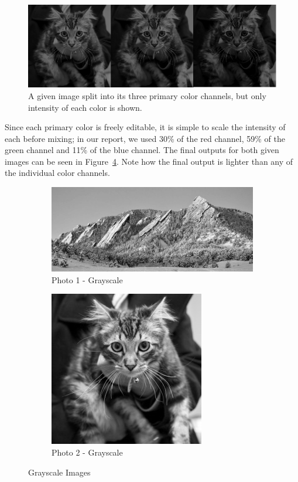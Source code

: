     \begin{figure}[ht]
      \centering
      \includegraphics[scale=0.4]{./img/photo2-explodedg.png}
      \caption{A given image split into its three primary color channels, but only intensity of each color is shown.}
      \label{3gray}
    \end{figure}

Since each primary color is freely editable, it is simple to scale the intensity of each before mixing; in our report, we used 30\% of the red channel, 59\% of the green channel and 11\% of the blue channel. The final outputs for both given images can be seen in Figure~\ref{fig:gray_images}. Note how the final output is lighter than any of the individual color channels.

    \begin{figure}[ht]
      \centering
      \begin{subfigure}{0.6\textwidth}
        \centering
        \includegraphics[scale=0.5]{./img/gray1.png}
        \caption{Photo 1 - Grayscale}
        \label{fig:p1g}
      \end{subfigure}
      \begin{subfigure}{0.3\textwidth}
        \centering
        \includegraphics[scale=0.5]{./img/gray2.png}
        \caption{Photo 2 - Grayscale}
        \label{fig:p2g}
      \end{subfigure}
      \caption{Grayscale Images}
      \label{fig:gray_images}
    \end{figure}

